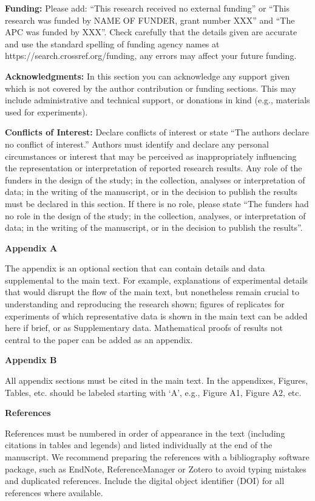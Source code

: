 \documentclass{article} %
\begin{document}
\noindent \textbf{Funding: }Please add: ``This research received no external funding'' or ``This research was funded by NAME OF FUNDER, grant number XXX'' and ``The APC was funded by XXX''. Check carefully that the details given are accurate and use the standard spelling of funding agency names at https://search.crossref.org/funding, any errors may affect your future funding.

\noindent \textbf{Acknowledgments:} In this section you can acknowledge any support given which is not covered by the author contribution or funding sections. This may include administrative and technical support, or donations in kind (e.g., materials used for experiments).

\noindent \textbf{Conflicts of Interest:} Declare conflicts of interest or state ``The authors declare no conflict of interest.'' Authors must identify and declare any personal circumstances or interest that may be perceived as inappropriately influencing the representation or interpretation of reported research results. Any role of the funders in the design of the study; in the collection, analyses or interpretation of data; in the writing of the manuscript, or in the decision to publish the results must be declared in this section. If there is no role, please state ``The funders had no role in the design of the study; in the collection, analyses, or interpretation of data; in the writing of the manuscript, or in the decision to publish the results''.

\noindent \textbf{Appendix A}

The appendix is an optional section that can contain details and data supplemental to the main text. For example, explanations of experimental details that would disrupt the flow of the main text, but nonetheless remain crucial to understanding and reproducing the research shown; figures of replicates for experiments of which representative data is shown in the main text can be added here if brief, or as Supplementary data. Mathematical proofs of results not central to the paper can be added as an appendix.

\noindent \textbf{Appendix B}

All appendix sections must be cited in the main text. In the appendixes, Figures, Tables, etc. should be labeled starting with `A', e.g., Figure A1, Figure A2, etc. 

\noindent \textbf{References}

\noindent References must be numbered in order of appearance in the text (including citations in tables and legends) and listed individually at the end of the manuscript. We recommend preparing the references with a bibliography software package, such as EndNote, ReferenceManager or Zotero to avoid typing mistakes and duplicated references. Include the digital object identifier (DOI) for all references where available.
\end{document}
